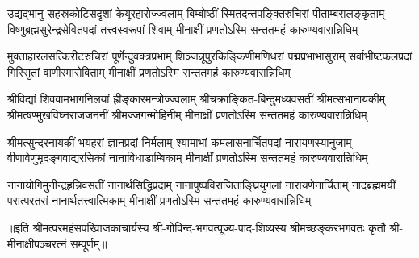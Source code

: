 

\fourlineindentedshloka
{उद्यद्भानु-सहस्रकोटिसदृशां केयूरहारोज्ज्वलाम्}
{बिम्बोष्ठीं स्मितदन्तपङ्क्तिरुचिरां पीताम्बरालङ्कृताम्‌}
{विष्णुब्रह्मसुरेन्द्रसेवितपदां तत्त्वस्वरूपां शिवाम्}
{मीनाक्षीं प्रणतोऽस्मि सन्ततमहं कारुण्यवारान्निधिम्‌}%

\fourlineindentedshloka
{मुक्ताहारलसत्किरीटरुचिरां पूर्णेन्दुवक्त्रप्रभाम्}
{शिञ्जन्नूपुरकिङ्किणीमणिधरां पद्मप्रभाभासुराम्‌}
{सर्वाभीष्टफलप्रदां गिरिसुतां वाणीरमासेविताम्}
{मीनाक्षीं प्रणतोऽस्मि सन्ततमहं कारुण्यवारान्निधिम्‌}%

\fourlineindentedshloka
{श्रीविद्यां शिववामभागनिलयां ह्रीङ्कारमन्त्रोज्ज्वलाम्}
{श्रीचक्राङ्कित-बिन्दुमध्यवसतीं श्रीमत्सभानायकीम्}
{श्रीमत्षण्मुखविघ्नराजजननीं श्रीमज्जगन्मोहिनीम्}
{मीनाक्षीं प्रणतोऽस्मि सन्ततमहं कारुण्यवारान्निधिम्}%

\fourlineindentedshloka
{श्रीमत्सुन्दरनायकीं भयहरां ज्ञानप्रदां निर्मलाम्‌}
{श्यामाभां कमलासनार्चितपदां नारायणस्यानुजाम्‌}
{वीणावेणुमृदङ्गवाद्यरसिकां नानाविधाडाम्बिकाम्}
{मीनाक्षीं प्रणतोऽस्मि सन्ततमहं कारुण्यवारान्निधिम्‌}%

\fourlineindentedshloka
{नानायोगिमुनीन्द्रहृन्निवसतीं नानार्थसिद्धिप्रदाम्‌}
{नानापुष्पविराजिताङ्घ्रियुगलां नारायणेनार्चिताम्‌}
{नादब्रह्ममयीं परात्परतरां नानार्थतत्त्वात्मिकाम्}
{मीनाक्षीं प्रणतोऽस्मि सन्ततमहं कारुण्यवारान्निधिम्‌}%

॥इति श्रीमत्परमहंसपरिव्राजकाचार्यस्य श्री-गोविन्द-भगवत्पूज्य-पाद-शिष्यस्य 
श्रीमच्छङ्करभगवतः कृतौ श्री-मीनाक्षीपञ्चरत्नं सम्पूर्णम्॥
